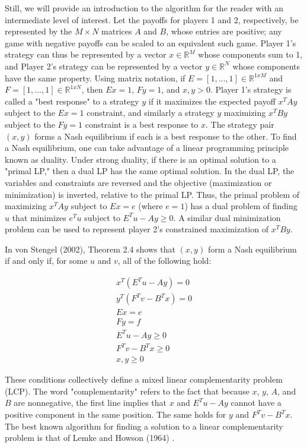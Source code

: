 \documentclass{article}
\begin{document}
Still, we will provide an introduction to the algorithm for the reader with an intermediate level of interest. Let the payoffs for players 1 and 2, respectively, be represented by the $M \times N$ matrices $A$ and $B$, whose entries are positive; any game with negative payoffs can be scaled to an equivalent such game. Player 1's strategy can thus be represented by a vector $x \in \mathbb{R}^M$ whose components sum to 1, and Player 2's strategy can be represented by a vector $y \in \mathbb{R}^N$ whose components have the same property. Using matrix notation, if $E=[1, ..., 1]\in\mathbb{R}^{1xM}$ and $F=[1, ..., 1]\in\mathbb{R}^{1xN}$, then $Ex=1$, $Fy=1$, and $x,y>0$.  Player 1's strategy is called a "best response" to a strategy $y$ if it maximizes the expected payoff $x^TAy$ subject to the $Ex=1$ constraint, and similarly a strategy $y$ maximizing $x^TBy$ subject to the $Fy=1$ constraint is a best response to $x$. The strategy pair $(x,y)$ forms a Nash equilibrium if each is a best response to the other. To find a Nash equilibrium, one can take advantage of a linear programming principle known as duality. Under strong duality, if there is an optimal solution to a "primal LP," then a dual LP has the same optimal solution. In the dual LP, the variables and constraints are reversed and the objective (maximization or minimization) is inverted, relative to the primal LP. Thus, the primal problem of maximizing $x^TAy$ subject to $Ex=e$ (where $e=1$) has a dual problem of finding $u$ that minimizes $e^Tu$ subject to $E^Tu-Ay \geq 0$. A similar dual minimization problem can be used to represent player 2's constrained maximization of $x^TBy$.

In von Stengel (2002), Theorem 2.4 shows that $(x,y)$ form a Nash equilibrium if and only if, for some $u$ and $v$, all of the following hold:

\begin{align*}
x^T(E^Tu-Ay) = 0 \\
y^T(F^Tv-B^Tx) = 0 \\
Ex = e \\
Fy = f\\
E^T u - A y \geq 0 \\
F^Tv - B^Tx \geq 0 \\
x, y \geq 0
\end{align*}

\noindent These conditions collectively define a mixed linear complementarity problem (LCP). The word "complementarity" refers to the fact that because $x$, $y$, $A$, and $B$ are nonnegative, the first line implies that $x$ and $E^Tu-Ay$ cannot have a positive component in the same position. The same holds for $y$ and $F^Tv-B^Tx$. The best known algorithm for finding a solution to a linear complementarity problem is that of Lemke and Howson (1964) \cite{lemkehowson}. 
\end{document}
